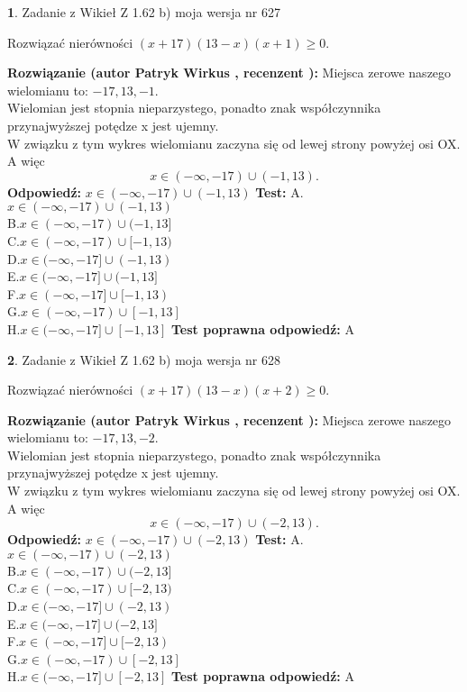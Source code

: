 \documentclass[12pt, a4paper]{article}
\theoremstyle{definition} %
\newtheorem{zad}{}
\newcommand{\zadStart}[1]{\begin{zad}#1\newline}
\newcommand{\zadStop}{\end{zad}}
\newcommand{\rozwStart}[2]{\noindent \textbf{Rozwiązanie (autor #1 , recenzent #2): }\newline}
\newcommand{\rozwStop}{\newline}
\newcommand{\odpStart}{\noindent \textbf{Odpowiedź:}\newline}
\newcommand{\odpStop}{\newline}
\newcommand{\testStart}{\noindent \textbf{Test:}\newline}
\newcommand{\testStop}{\newline}
\newcommand{\kluczStart}{\noindent \textbf{Test poprawna odpowiedź:}\newline}
\newcommand{\kluczStop}{\newline}
\begin{document}
\zadStart{Zadanie z Wikieł Z 1.62 b) moja wersja nr 627}

Rozwiązać nierówności $(x+17)(13-x)(x+1)\ge0$.
\zadStop
\rozwStart{Patryk Wirkus}{}
Miejsca zerowe naszego wielomianu to: $-17, 13, -1$.\\
Wielomian jest stopnia nieparzystego, ponadto znak współczynnika przy\linebreak najwyższej potędze x jest ujemny.\\ W związku z tym wykres wielomianu zaczyna się od lewej strony powyżej osi OX. A więc $$x \in (-\infty,-17) \cup (-1,13).$$
\rozwStop
\odpStart
$x \in (-\infty,-17) \cup (-1,13)$
\odpStop
\testStart
A.$x \in (-\infty,-17) \cup (-1,13)$\\
B.$x \in (-\infty,-17) \cup (-1,13]$\\
C.$x \in (-\infty,-17) \cup [-1,13)$\\
D.$x \in (-\infty,-17] \cup (-1,13)$\\
E.$x \in (-\infty,-17] \cup (-1,13]$\\
F.$x \in (-\infty,-17] \cup [-1,13)$\\
G.$x \in (-\infty,-17) \cup [-1,13]$\\
H.$x \in (-\infty,-17] \cup [-1,13]$
\testStop
\kluczStart
A
\kluczStop



\zadStart{Zadanie z Wikieł Z 1.62 b) moja wersja nr 628}

Rozwiązać nierówności $(x+17)(13-x)(x+2)\ge0$.
\zadStop
\rozwStart{Patryk Wirkus}{}
Miejsca zerowe naszego wielomianu to: $-17, 13, -2$.\\
Wielomian jest stopnia nieparzystego, ponadto znak współczynnika przy\linebreak najwyższej potędze x jest ujemny.\\ W związku z tym wykres wielomianu zaczyna się od lewej strony powyżej osi OX. A więc $$x \in (-\infty,-17) \cup (-2,13).$$
\rozwStop
\odpStart
$x \in (-\infty,-17) \cup (-2,13)$
\odpStop
\testStart
A.$x \in (-\infty,-17) \cup (-2,13)$\\
B.$x \in (-\infty,-17) \cup (-2,13]$\\
C.$x \in (-\infty,-17) \cup [-2,13)$\\
D.$x \in (-\infty,-17] \cup (-2,13)$\\
E.$x \in (-\infty,-17] \cup (-2,13]$\\
F.$x \in (-\infty,-17] \cup [-2,13)$\\
G.$x \in (-\infty,-17) \cup [-2,13]$\\
H.$x \in (-\infty,-17] \cup [-2,13]$
\testStop
\kluczStart
A
\kluczStop
\end{document}
